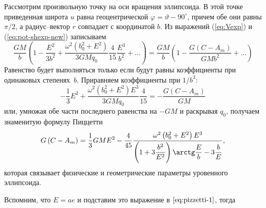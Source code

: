 \documentclass[11pt, a4paper,addpoints]{exam}
\theoremstyle{remark}
\renewcommand{\phi}{\ensuremath{\varphi}}
\renewcommand{\theta}{\vartheta}
\begin{document}
Рассмотрим произвольную точку на оси вращения эллипсоида. В этой точке приведенная широта $u$ равна
геоцентрической $\phi = \theta - 90^\circ$, причем обе они равны $\pi/2$, а радиус--вектор
$r$ совпадает с координатой $b$. Из выражений (\ref{eq:Vexp}) и (\ref{eq:pot-shexp-new}) записываем
\begin{equation}
    \dfrac{GM}{b} \left( 1 - \dfrac{E^2}{3b^2} + \dfrac{\omega^2 \left( b_0^2 + E^2
    \right)}{3GMq_0} \dfrac{4}{15}\dfrac{E^3}{b^2} + \dots \right)
    = \dfrac{GM}{b} \left( 1 - \dfrac{G\left( C - A_m \right)}{GM b^2} + \dots\right)
\end{equation}
Равенство будет выполняться только если будут равны коэффициенты при одинаковых степенях~$b$.
Приравняем коэффициенты при $1/b^3$:
\begin{equation}
   -\dfrac{1}{3}E^2 + \dfrac{\omega^2 \left( b_0^2 + E^2
    \right)E^3}{3GMq_0} \dfrac{4}{15}
    =  - \dfrac{G\left( C - A_m \right)}{GM}
    \label{eq:pizzetti-1}
\end{equation}
или, умножая обе части последнего равенства на $-GM$ и раскрывая $q_0$, получаем знаменитую формулу Пиццетти
\begin{equation}
    G\left( C - A_m \right) = \dfrac{1}{3} GM E^2 - \dfrac{4}{45} \dfrac{\omega^2 \left( b_0^2 +
    E^2\right) E^3}{
    \left( 1 + 3\dfrac{b^2}{E^2} \right)\arctg\dfrac{E}{b} - 3\dfrac{b}{E}},
    \label{eq:pizzetti}
\end{equation}
которая связывает физические и геометрические параметры уровенного эллипсоида.

Вспомним, что $E = ae$ и подставим это выражение в $\ref{eq:pizzetti-1}$, тогда
\end{document}
